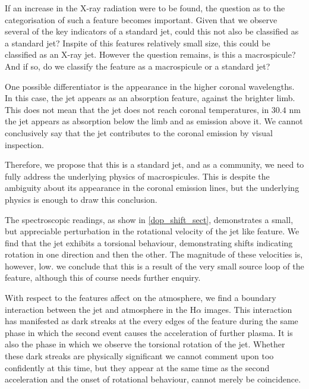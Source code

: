 \documentclass{emulateapj}
\begin{document}
If an increase in the X-ray radiation were to be found, the question as to the categorisation of such a feature becomes important.
Given that we observe several of the key indicators of a standard jet, could this not also be classified as a standard jet? 
Inspite of this features relatively small size, this could be classified as an X-ray jet.
However the question remains, is this a macrospicule?
And if so, do we classify the feature as a macrospicule or a standard jet?

One possible differentiator is the appearance in the higher coronal wavelengths.
In this case, the jet appears as an absorption feature, against the brighter limb.
This does not mean that the jet does not reach coronal temperatures, in $30.4$ nm the jet appears as absorption below the limb and as emission above it.
We cannot conclusively say that the jet contributes to the coronal emission by visual inspection.

Therefore, we propose that this is a standard jet, and as a community, we need to fully address the underlying physics of macrospicules.
This is despite the ambiguity about its appearance in the coronal emission lines, but the underlying physics is enough to draw this conclusion.

The spectroscopic readings, as show in \cref{dop_shift_sect}, demonstrates a small, but appreciable perturbation in the rotational velocity of the jet like feature.
We find that the jet exhibits a torsional behaviour, demonstrating shifts indicating rotation in one direction and then the other.
The magnitude of these velocities is, however, low.
we conclude that this is a result of the very small source loop of the feature, although this of course needs further enquiry. 

With respect to the features affect on the atmosphere, we find a boundary interaction between the jet and atmosphere in the H$\alpha$ images.
This interaction has manifested as dark streaks at the every edges of the feature during the same phase in which the second event causes the acceleration of further plasma.
It is also the phase in which we observe the torsional rotation of the jet.
Whether these dark streaks are physically significant we cannot comment upon too confidently at this time, but they appear at the same time as the second acceleration and the onset of rotational behaviour, cannot merely be coincidence.





\end{document}
